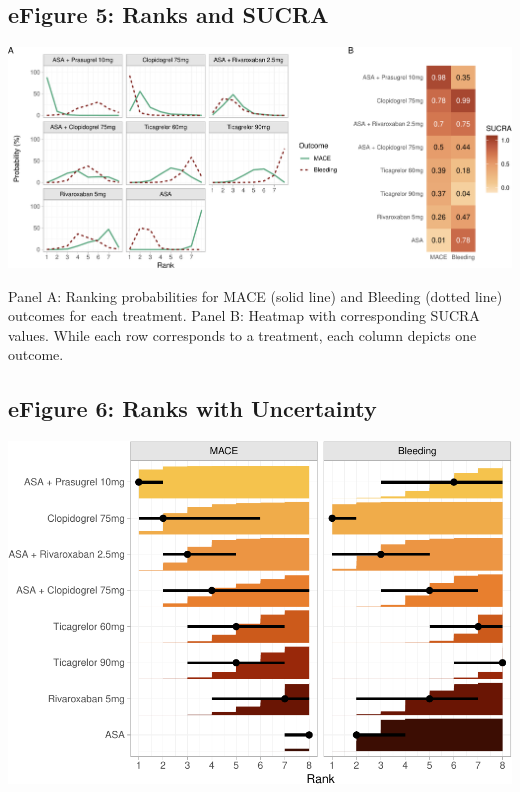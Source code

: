 \documentclass[
  12pt,
]{article}
\begin{document}
\begin{landscape}
\newpage

\hypertarget{efigure-5-ranks-and-sucra}{%
\subsection{eFigure 5: Ranks and
SUCRA}\label{efigure-5-ranks-and-sucra}}

\begin{center}\includegraphics{03_supplementary_files/figure-latex/unnamed-chunk-29-1} \end{center}

Panel A: Ranking probabilities for MACE (solid line) and Bleeding
(dotted line) outcomes for each treatment. Panel B: Heatmap with
corresponding SUCRA values. While each row corresponds to a treatment,
each column depicts one outcome.

\end{landscape}

\hypertarget{efigure-6-ranks-with-uncertainty}{%
\subsection{eFigure 6: Ranks with
Uncertainty}\label{efigure-6-ranks-with-uncertainty}}

\begin{center}\includegraphics{03_supplementary_files/figure-latex/unnamed-chunk-30-1} \end{center}
\end{document}
